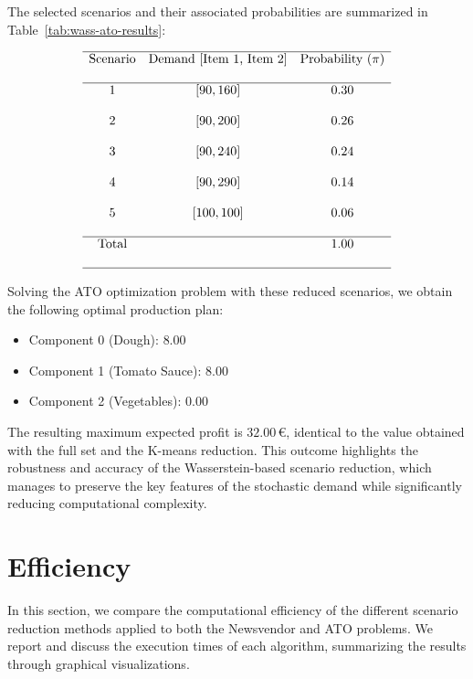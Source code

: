 \documentclass[a4paper,12pt]{article}
\begin{document}
	The selected scenarios and their associated probabilities are summarized in Table~\ref{tab:wass-ato-results}:
	
	\[
	\begin{array}{ccc}
		\hline
		\text{Scenario} & \text{Demand [Item 1, Item 2]} & \text{Probability (\(\pi\))} \\\\
		\hline
		1 & [90, 160] & 0.30 \\\\
		2 & [90, 200] & 0.26 \\\\
		3 & [90, 240] & 0.24 \\\\
		4 & [90, 290] & 0.14 \\\\
		5 & [100, 100] & 0.06 \\\\
		\hline
		\text{Total} & & 1.00 \\\\
		\hline
	\end{array}
	\]
	\label{tab:wass-ato-results}
	
	Solving the ATO optimization problem with these reduced scenarios, we obtain the following optimal production plan:
	\begin{itemize}
		\item Component 0 (Dough): $8.00$
		\item Component 1 (Tomato Sauce): $8.00$
		\item Component 2 (Vegetables): $0.00$
	\end{itemize}
	
	The resulting maximum expected profit is $32.00$\,€, identical to the value obtained with the full set and the K-means reduction. This outcome highlights the robustness and accuracy of the Wasserstein-based scenario reduction, which manages to preserve the key features of the stochastic demand while significantly reducing computational complexity.
	
	\section{Efficiency}
	
	In this section, we compare the computational efficiency of the different scenario reduction methods applied to both the Newsvendor and ATO problems. We report and discuss the execution times of each algorithm, summarizing the results through graphical visualizations.
	
\end{document}
